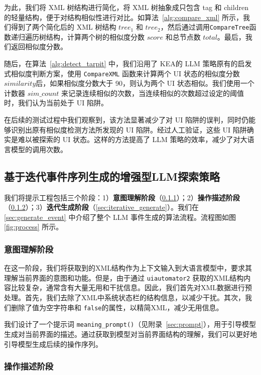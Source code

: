 \documentclass[twocolumn, 10pt]{article}
\newcommand{\kea}{K{\small\MakeUppercase{ea}}}
\begin{document}
为此，我们将 XML 树结构进行简化，将 XML 树抽象成只包含 tag 和 children 的轻量结构，便于对结构相似性进行对比。如算法~\ref{alg:compare_xml} 所示，我们得到了两个简化后的 XML 树结构 $tree_1$ 和 $tree_2$，然后通过调用\texttt{CompareTree}函数递归遍历树结构，计算两个树的相似度分数 $score$ 和总节点数 $total$。最后，我们返回相似度分数。

随后，在算法~\ref{alg:detect_tarpit} 中，我们沿用了 \kea 的 LLM 策略原有的启发式相似度判断方案，使用 \texttt{CompareXML} 函数来计算两个 UI 状态的相似度分数 $similarity$后，如果相似度分数大于 90，则认为两个 UI 状态相似。我们使用一个计数器 $sim\_count$ 来记录连续相似的次数，当连续相似的次数超过设定的阈值时，我们认为当前处于 UI 陷阱。

在后续的测试过程中我们观察到，该方法显著减少了对 UI 陷阱的误判，同时仍能够识别出原有相似度检测方法所发现的 UI 陷阱。经过人工验证，这些 UI 陷阱确实是难以被探索的 UI 状态。这样的方法提高了 LLM 策略的效率，减少了对大语言模型的调用次数。

\subsection{基于迭代事件序列生成的增强型LLM探索策略}
\label{sec:iterative}

我们将提示工程包括三个阶段：1）\textbf{意图理解阶段}（\textsection\ref{sec:intent}）；2）\textbf{操作描述阶段}（\textsection\ref{sec:action}）；3）\textbf{迭代生成阶段}（\textsection\ref{sec:iterative_generate}）。我们在\textsection\ref{sec:generate_event} 中介绍了整个 LLM 事件生成的算法流程。流程图如图 \ref{fig:process} 所示。

\subsubsection{意图理解阶段}
\label{sec:intent}

在这一阶段，我们将获取到的XML结构作为上下文输入到大语言模型中，要求其理解当前界面的意图和功能。但是，由于通过 \texttt{uiautomator2} 获取的XML结构内容比较复杂，通常含有大量无用和干扰信息。因此，我们首先对XML数据进行预处理。首先，我们去除了XML中系统状态栏的结构信息，以减少干扰。其次，我们删除了值为空字符串和 \texttt{false}的属性，以精简XML，减少无用信息。

我们设计了一个提示词 \texttt{meaning\_prompt()}（见附录~\ref{sec:prompt}），用于引导模型生成对当前界面的描述。通过获取到模型对当前界面结构的理解，我们可以更好地引导模型生成后续的操作序列。

\subsubsection{操作描述阶段}
\label{sec:action}
\end{document}
